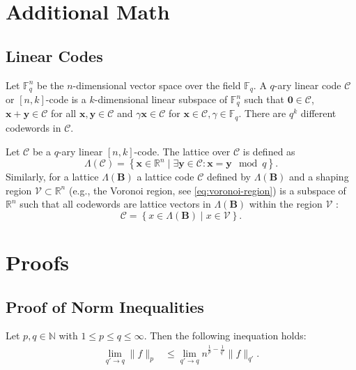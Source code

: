\chapter{Additional Math}
\section{Linear Codes} \label{sec:linear-code} %
Let $\mathbb{F}_q^n$ be the $n$-dimensional vector space over the field $\mathbb{F}_q$. A $q$-ary linear code $\mathcal{C}$ or $[n, k]$-code \cite{VanLint12} is a $k$-dimensional linear subspace of $\mathbb{F}_q^n$ such that $\mathbf{0} \in \mathcal{C}$, $\mathbf{x} + \mathbf{y} \in \mathcal{C}$ for all $\mathbf{x}, \mathbf{y} \in \mathcal{C}$ and $\gamma \mathbf{x} \in \mathcal{C}$ for $\mathbf{x} \in \mathcal{C}, \gamma \in \mathbb{F}_q$. There are $q^k$ different codewords in $\mathcal{C}$.

Let $\mathcal{C}$ be a $q$-ary linear $[n, k]$-code. The lattice over $\mathcal{C}$ \cite{GJS15} is defined as
\begin{equation}
    \Lambda(\mathcal{C}) = \left\{ \mathbf{x} \in \mathbb{R}^n \mid \exists \mathbf{y} \in \mathcal{C} : \mathbf{x} = \mathbf{y} \mod q  \right\}.
\end{equation} %
Similarly, for a lattice $\Lambda(\mathbf{B})$ a lattice code $\mathcal{C}$ defined by $\Lambda(\mathbf{B})$ and a shaping region $\mathcal{V} \subset \mathbb{R}^n$ (e.g., the Voronoi region, see \cref{eq:voronoi-region}) is a subspace of $\mathbb{R}^n$ such that all codewords are lattice vectors in $\Lambda(\mathbf{B})$ within the region $\mathcal{V}$ \cite{SFS08}:
\begin{equation}
    \mathcal{C} = \left\{ x \in \Lambda(\mathbf{B}) \mid x \in \mathcal{V} \right\}.
\end{equation} %

\chapter{Proofs}
\section{Proof of Norm Inequalities}\label{sec:proof-norm}
Let $p, q \in \mathbb{N}$ with $1 \leq p \leq q \leq \infty$. Then the following inequation holds:
\begin{align}
    \lim_{q' \rightarrow q}\| f \|_p & \leq \lim_{q' \rightarrow q} n^{\frac{1}{p} - \frac{1}{q'}}\| f \|_{q'}.
\end{align}

